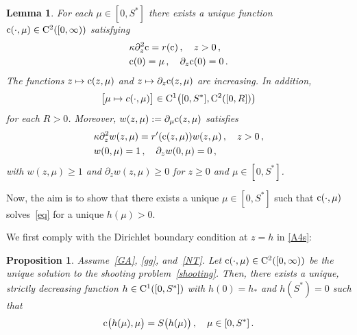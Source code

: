 \documentclass[reqno,11pt]{amsart}
\newtheorem{lem}[thm]{Lemma}
\newtheorem{prop}[thm]{Proposition}
\numberwithin{equation}{section}
\begin{document}
\begin{lem}\label{L17} 
For each $\mu\in [0,S^*]$ there exists a unique function ${\rm c}(\cdot,\mu)\in {\rm C}^2([0,\infty))$ satisfying
\begin{subequations}\label{shooting}
\begin{align}
&\kappa\partial_z^2 {\rm c}=r({\rm c})\,, \quad z>0\,, \label{A1ss}\\
&{\rm c}(0)=\mu\,,\quad \partial_z {\rm c}(0)=0\,. \label{A4ss}
\end{align}
\end{subequations}
The functions $z\mapsto {\rm c}(z,\mu)$ and $z\mapsto \partial_z{\rm c}(z,\mu)$ are increasing. In addition,
$$
\big[\mu\mapsto c(\cdot,\mu)\big]\in {\rm C}^1\big( [0,S^*],{\rm C}^2([0,R])\big)
$$
for each $R>0$. Moreover, $w(z,\mu):=\partial_\mu {\rm c}(z,\mu)$ satisfies
\begin{subequations}\label{shootingm}
\begin{align}
&\kappa\partial_z^2 w(z,\mu)=r'({\rm c}(z,\mu))w(z,\mu)\,, \quad z>0\,, \label{A1ssm}\\
&w(0,\mu)=1\,,\quad \partial_z w(0,\mu)=0\,, \label{A4ssm}
\end{align}
\end{subequations}
with $w(z,\mu)\ge 1$ and $\partial_zw(z,\mu)\ge 0$ for $z\ge 0$ and  $\mu\in [0,S^*]$.
\end{lem}

Now, the aim is to show that there exists a unique $\mu\in [0,S^*]$ such that ${\rm c}(\cdot,\mu)$ solves~\eqref{eq} for a unique $h(\mu)>0$.


We first comply with the Dirichlet boundary condition at $z=h$ in \eqref{A4s}:

\begin{prop}\label{L21}
Assume~\eqref{GA}, \eqref{gg}, and~\eqref{NT}.
Let ${\rm c}(\cdot,\mu)\in {\rm C}^2([0,\infty))$  be the unique solution to the shooting problem~\eqref{shooting}.
Then, there exists a unique, strictly decreasing function $h\in {\rm C}^1([0,S^*])$  with $h(0)=h_*$ and $h(S^*)=0$ such that 
\begin{align}\label{id}
{\rm c}\big(h(\mu),\mu\big)=S\big(h(\mu)\big)\,,\quad \mu\in [0,S^*]\,.
\end{align}
\end{prop}
\end{document}
